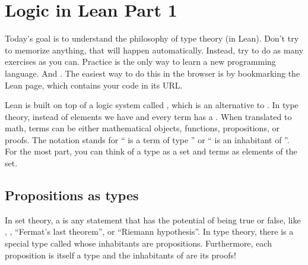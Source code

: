 \documentclass[letterpaper,10pt,english]{sphinxmanual}
\begin{document}
\sphinxstepscope


\chapter{Logic in Lean \sphinxhyphen{} Part 1}
\label{\detokenize{day1:logic-in-lean-part-1}}\label{\detokenize{day1:day1}}\label{\detokenize{day1::doc}}
\sphinxAtStartPar
Today’s goal is to understand the philosophy of type theory (in Lean).
Don’t try to memorize anything, that will happen automatically.
Instead, try to do as many exercises as you can.
Practice is the only way to learn a new programming language.
And .
The easiest way to do this in the browser is by bookmarking the Lean page, which contains your code in its URL.

\sphinxAtStartPar
Lean is built on top of a logic system called , which is an alternative to .
In type theory, instead of elements we have  and every term has a .
When translated to math, terms can be either mathematical objects, functions, propositions, or proofs.
The notation  stands for “ is a term of type ” or “ is an inhabitant of ”.
For the most part, you can think of a type as a set and terms as elements of the set.


\section{Propositions as types}
\label{\detokenize{day1:propositions-as-types}}
\sphinxAtStartPar
In set theory, a  is any statement that has the potential of being true or false, like , , “Fermat’s last theorem”, or “Riemann hypothesis”.
In type theory, there is a special type called  whose inhabitants are propositions.
Furthermore, each proposition  is itself a type and the inhabitants of  are its proofs!

\begin{sphinxVerbatim}[commandchars=\\\{\}]
           
               
\end{sphinxVerbatim}
\end{document}
